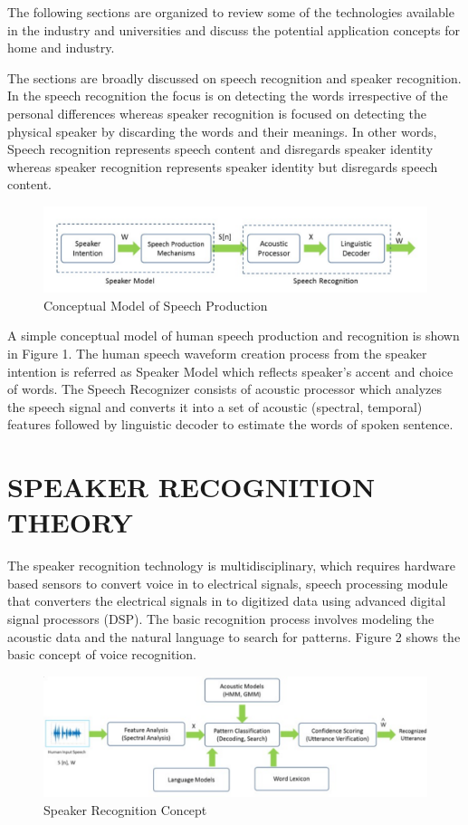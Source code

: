 \documentclass[sigconf]{acmart}
\begin{document}
The following sections are organized to review some of the technologies available in the industry and universities and discuss the potential application concepts for home and industry.
\par\null\par
The sections are broadly discussed on speech recognition and speaker recognition. In the speech recognition the focus is on detecting the words irrespective of the personal differences whereas speaker recognition is focused on detecting the physical speaker by discarding the words and their meanings. In other words, Speech recognition represents speech content and disregards speaker identity whereas speaker recognition represents speaker identity but disregards speech content.

\begin{figure}
\includegraphics[width=1.0\columnwidth]{images/speechrecognition.pdf}
\caption{Conceptual Model of Speech Production}
\end{figure}

A simple conceptual model of human speech production and recognition is shown in Figure 1. The human speech waveform creation process from the speaker intention is referred as Speaker Model which reflects speaker's accent and choice of words. The Speech Recognizer consists of acoustic processor which analyzes the speech signal and converts it into a set of acoustic (spectral, temporal) features followed by linguistic decoder to estimate the words of spoken sentence.

\section{SPEAKER RECOGNITION THEORY}
The speaker recognition technology is multidisciplinary, which requires hardware based sensors to convert voice in to electrical signals, speech processing module that converters the electrical signals in to digitized data using advanced digital signal processors (DSP). The basic recognition process involves modeling the acoustic data and the natural language to search for patterns. Figure 2 shows the basic concept of voice recognition.
\newline
\begin{figure}
\includegraphics[width=1.0\columnwidth]{images/speakerrecognition.pdf}
\caption{Speaker Recognition Concept}
\end{figure}
\end{document}
